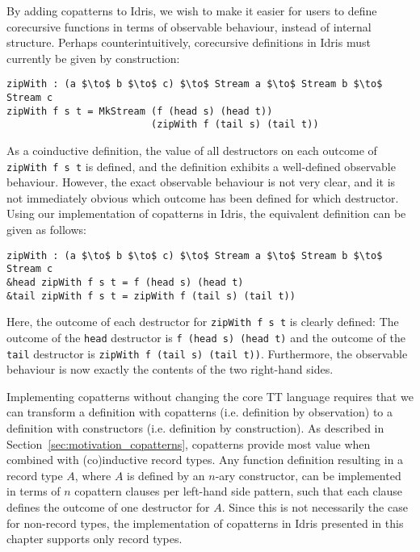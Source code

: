 By adding copatterns to Idris, we wish to make it easier for users to define
corecursive functions in terms of observable behaviour, instead of internal
structure. Perhaps counterintuitively, corecursive definitions in Idris must
currently be given by construction:
\begin{lstlisting}[mathescape,title=\idrisBlock]
zipWith : (a $\to$ b $\to$ c) $\to$ Stream a $\to$ Stream b $\to$ Stream c
zipWith f s t = MkStream (f (head s) (head t)) 
                         (zipWith f (tail s) (tail t))
\end{lstlisting}
As a coinductive definition, the value of all destructors on each outcome of
\texttt{zipWith~f~s~t} is defined, and the definition exhibits a well-defined
observable behaviour. However, the exact observable behaviour is not very clear, and
it is not immediately obvious which outcome has been defined for which
destructor. Using our implementation of copatterns in Idris, the equivalent definition can be given as follows:
\begin{lstlisting}[mathescape,title=\idrisBlock]
zipWith : (a $\to$ b $\to$ c) $\to$ Stream a $\to$ Stream b $\to$ Stream c
&head zipWith f s t = f (head s) (head t)
&tail zipWith f s t = zipWith f (tail s) (tail t))
\end{lstlisting}
Here, the outcome of each destructor for \texttt{zipWith~f~s~t} is clearly
defined: The outcome of the \texttt{head} destructor is
\texttt{f~(head~s)~(head~t)} and the outcome of the \texttt{tail} destructor is
\texttt{zipWith~f~(tail~s)~(tail~t))}. Furthermore, the observable behaviour is now
exactly the contents of the two right-hand sides.

Implementing copatterns without changing the core TT language requires that we
can transform a definition with copatterns (i.e. definition by observation) to a
definition with constructors (i.e. definition by construction). As described in
Section~\ref{sec:motivation_copatterns}, copatterns provide most value when
combined with (co)inductive record types. Any function definition
resulting in a record type $A$, where $A$ is defined by an $n$-ary constructor,
can be implemented in terms of $n$ copattern clauses per left-hand side pattern, such that each clause defines the
outcome of one destructor for $A$. Since this is not necessarily the case for non-record
types, the implementation of copatterns in Idris presented in this chapter
supports only record types.

